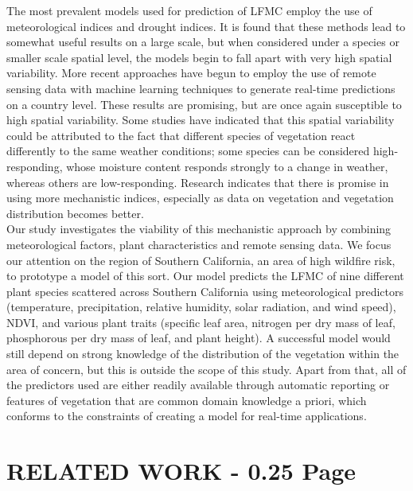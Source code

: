\documentclass[twocolumn,10pt]{article}
\begin{document}
The most prevalent models used for prediction of LFMC employ the use of meteorological indices and drought indices. It is found that these methods lead to somewhat useful results on a large scale, but when considered under a species or smaller scale spatial level, the models begin to fall apart with very high spatial variability. %
More recent approaches have begun to employ the use of remote sensing data with machine learning techniques to generate real-time predictions on a country level. These results are promising, but are once again susceptible to high spatial variability. Some studies have indicated that this spatial variability could be attributed to the fact that different species of vegetation react differently to the same weather conditions; some species can be considered high-responding, whose moisture content responds strongly to a change in weather, whereas others are low-responding. Research indicates that there is promise in using more mechanistic indices, especially as data on vegetation and vegetation distribution becomes better. \\

Our study investigates the viability of this mechanistic approach by combining meteorological factors, plant characteristics and remote sensing data. We focus our attention on the region of Southern California, an area of high wildfire risk, to prototype a model of this sort. Our model predicts the LFMC of nine different plant species scattered across Southern California using meteorological predictors (temperature, precipitation, relative humidity, solar radiation, and wind speed), NDVI, and various plant traits (specific leaf area, nitrogen per dry mass of leaf, phosphorous per dry mass of leaf, and plant height). A successful model would still depend on strong knowledge of the distribution of the vegetation within the area of concern, but this is outside the scope of this study. Apart from that, all of the predictors used are either readily available through automatic reporting or features of vegetation that are common domain knowledge a priori, which conforms to the constraints of creating a model for real-time applications. \\

\section{RELATED WORK - 0.25 Page}
\end{document}
